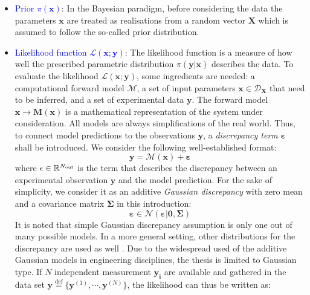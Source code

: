 \begin{itemize}[left=0pt]
    \item \textcolor{blue}{Prior $\pi(\boldsymbol{x})$}: In the Bayesian paradigm, before considering the data the parameters $\boldsymbol{x}$ are treated as realisations from a random vector $\boldsymbol{X}$ which is assumed to follow the so-called prior distribution.
    

    \item \textcolor{blue}{Likelihood function $\mathcal{L}(\boldsymbol{x};\boldsymbol{y})$}: The likelihood function is a measure of how well the prescribed parametric distribution $\pi(\boldsymbol{y}|\boldsymbol{x})$ describes the data. To evaluate the likelihood $\mathcal{L}(\boldsymbol{x};\boldsymbol{y})$, some ingredients are needed: a computational forward model $\mathcal{M}$, a set of input parameters $\boldsymbol{x} \in\mathcal{D}_{\boldsymbol{X}}$ that need to be inferred, and a set of experimental data $\boldsymbol{y}$.
    The forward model $\boldsymbol{x} \rightarrow \boldsymbol{M}(\boldsymbol{x})$ is a mathematical representation of the system under consideration. All models are always simplifications of the real world. Thus, to connect model predictions to the observations $\boldsymbol{y}$, a \textit{discrepancy term} $\boldsymbol{\varepsilon}$ shall be introduced. We consider the following well-established format:
    \begin{equation}
        \label{eq: discrepancy term}
        \boldsymbol{y} = \mathcal{M}(\boldsymbol{x}) + \boldsymbol{\varepsilon}
    \end{equation}
    where $\epsilon \in \mathbb{R}^{N_{\rm{out}}}$ is the term that describes the discrepancy between an experimental observation $\boldsymbol{y}$ and the model prediction. For the sake of simplicity, we consider it as an additive \textit{Gaussian discrepancy} with zero mean and a covariance matrix $\boldsymbol{\Sigma}$ in this introduction:
        \begin{equation}
            \label{eq: Gaussian discrepancy}
            \boldsymbol{\varepsilon} \in \mathcal{N}(\boldsymbol{\varepsilon}|\boldsymbol{0},\boldsymbol{\Sigma})
        \end{equation}
    It is noted that simple Gaussian discrepancy assumption is only one out of many possible models. In a more general setting, other distributions for the discrepancy are used as well \citep{UQdoc}. Due to the widespread used of the additive Gaussian models in engineering disciplines, the thesis is limited to Gaussian type. If $N$ independent measurement $\boldsymbol{y_{i}}$ are available and gathered in the data set $\boldsymbol{y} \stackrel{\mathrm{def}}{=} \{{\boldsymbol{y}^{(1)}},\cdots,{\boldsymbol{y}^{(N)}}\}$, the likelihood can thus be written as:

\end{itemize}
